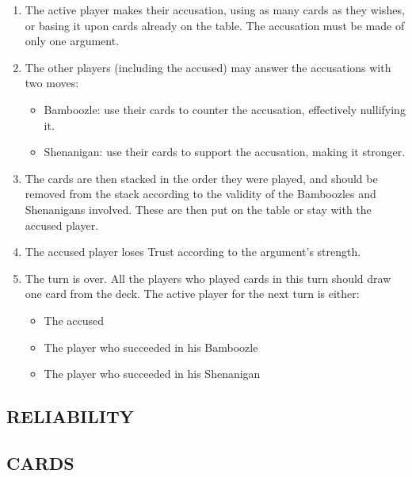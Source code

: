 \documentclass[a4paper, 11pt]{article}
\begin{document}
	\begin{enumerate}
		\item The active player makes their accusation, using as many cards as they wishes, or basing it upon cards already on the table. The accusation must be made of only one argument.

		\item The other players (including the accused) may answer the accusations with two moves:
			\begin{itemize}
				\item Bamboozle: use their cards to counter the accusation, effectively nullifying it.

				\item Shenanigan: use their cards to support the accusation, making it stronger.
			\end{itemize}

		\item The cards are then stacked in the order they were played, and should be removed from the stack according to the validity of the Bamboozles and Shenanigans involved. These are then put on the table or stay with the accused player.

		\item The accused player loses Trust according to the argument's strength.

		\item The turn is over. All the players who played cards in this turn should draw one card from the deck. The active player for the next turn is either:
			 \begin{itemize}
				\item The accused

				\item The player who succeeded in his Bamboozle

				\item The player who succeeded in his Shenanigan
			\end{itemize}

	\end{enumerate}

\subsection*{RELIABILITY}

\subsection*{CARDS}
\end{document}
